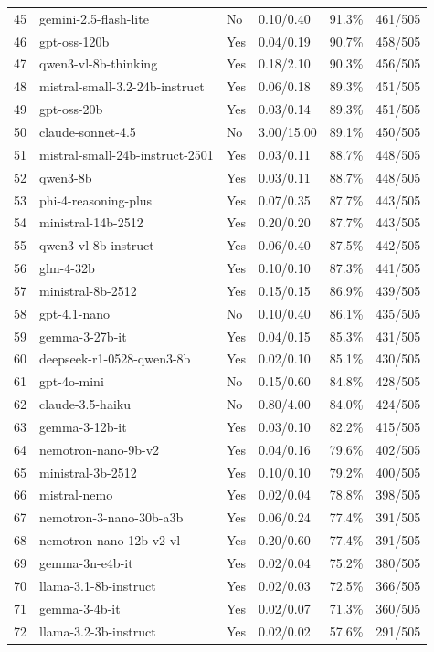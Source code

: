 \documentclass[11pt]{article}
\begin{document}
\begin{longtable}{rlllrr}
  45 & gemini-2.5-flash-lite & No & 0.10/0.40 & 91.3\% & 461/505 \\
  46 & gpt-oss-120b & Yes & 0.04/0.19 & 90.7\% & 458/505 \\
  47 & qwen3-vl-8b-thinking & Yes & 0.18/2.10 & 90.3\% & 456/505 \\
  48 & mistral-small-3.2-24b-instruct & Yes & 0.06/0.18 & 89.3\% & 451/505 \\
  49 & gpt-oss-20b & Yes & 0.03/0.14 & 89.3\% & 451/505 \\
  50 & claude-sonnet-4.5 & No & 3.00/15.00 & 89.1\% & 450/505 \\
  51 & mistral-small-24b-instruct-2501 & Yes & 0.03/0.11 & 88.7\% & 448/505 \\
  52 & qwen3-8b & Yes & 0.03/0.11 & 88.7\% & 448/505 \\
  53 & phi-4-reasoning-plus & Yes & 0.07/0.35 & 87.7\% & 443/505 \\
  54 & ministral-14b-2512 & Yes & 0.20/0.20 & 87.7\% & 443/505 \\
  55 & qwen3-vl-8b-instruct & Yes & 0.06/0.40 & 87.5\% & 442/505 \\
  56 & glm-4-32b & Yes & 0.10/0.10 & 87.3\% & 441/505 \\
  57 & ministral-8b-2512 & Yes & 0.15/0.15 & 86.9\% & 439/505 \\
  58 & gpt-4.1-nano & No & 0.10/0.40 & 86.1\% & 435/505 \\
  59 & gemma-3-27b-it & Yes & 0.04/0.15 & 85.3\% & 431/505 \\
  60 & deepseek-r1-0528-qwen3-8b & Yes & 0.02/0.10 & 85.1\% & 430/505 \\
  61 & gpt-4o-mini & No & 0.15/0.60 & 84.8\% & 428/505 \\
  62 & claude-3.5-haiku & No & 0.80/4.00 & 84.0\% & 424/505 \\
  63 & gemma-3-12b-it & Yes & 0.03/0.10 & 82.2\% & 415/505 \\
  64 & nemotron-nano-9b-v2 & Yes & 0.04/0.16 & 79.6\% & 402/505 \\
  65 & ministral-3b-2512 & Yes & 0.10/0.10 & 79.2\% & 400/505 \\
  66 & mistral-nemo & Yes & 0.02/0.04 & 78.8\% & 398/505 \\
  67 & nemotron-3-nano-30b-a3b & Yes & 0.06/0.24 & 77.4\% & 391/505 \\
  68 & nemotron-nano-12b-v2-vl & Yes & 0.20/0.60 & 77.4\% & 391/505 \\
  69 & gemma-3n-e4b-it & Yes & 0.02/0.04 & 75.2\% & 380/505 \\
  70 & llama-3.1-8b-instruct & Yes & 0.02/0.03 & 72.5\% & 366/505 \\
  71 & gemma-3-4b-it & Yes & 0.02/0.07 & 71.3\% & 360/505 \\
  72 & llama-3.2-3b-instruct & Yes & 0.02/0.02 & 57.6\% & 291/505 \\
\end{longtable}
\end{document}
